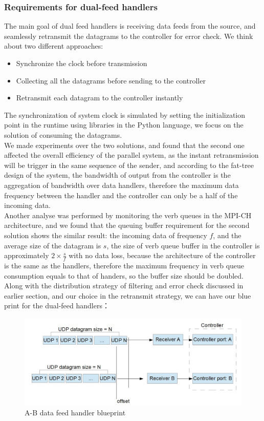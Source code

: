 \documentclass[11pt,openright,a4paper]{report}
\begin{document}
\subsubsection{Requirements for dual-feed handlers}
The main goal of dual feed handlers is receiving data feeds from the source, and seamlessly retransmit the datagrams to the controller for error check. We think about two different approaches:
\begin{itemize}
	\item Synchronize the clock before transmission
	\item Collecting all the datagrams before sending to the controller
	\item Retransmit each datagram to the controller instantly
\end{itemize}
The synchronization of system clock is simulated by setting the initialization point in the runtime using libraries in the Python language, we focus on the solution of consuming the datagrams.\\
We made experiments over the two solutions, and found that the second one affected the overall efficiency of the parallel system, as the instant retransmission will be trigger in the same sequence of the sender, and according to the fat-tree design of the system, the bandwidth of output from the controller is the aggregation of bandwidth over data handlers, therefore the maximum data frequency between the handler and the controller can only be a half of the incoming data.\\
Another analyse was performed by monitoring the verb queues in the MPI-CH architecture, and we found that the queuing buffer requirement for the second solution shows the similar result: the incoming data of frequency $f$, and the average size of the datagram is $s$, the size of verb queue buffer in the controller is approximately $2\times \frac{s}{f}$ with no data loss, because the architecture of the controller is the same as the handlers, therefore the maximum frequency in verb queue consumption equals to that of handers, so the buffer size should be doubled.\\
Along with the distribution strategy of filtering and error check discussed in earlier section, and our choice in the retransmit strategy, we can have our blue print for the dual-feed handlers：
\begin{figure}[H]
\centering
\includegraphics[width=0.5\linewidth]{picture/receiverBlueprint}
\caption{A-B data feed handler blueprint}
\label{fig:receiverBlueprint}
\end{figure}
\end{document}
